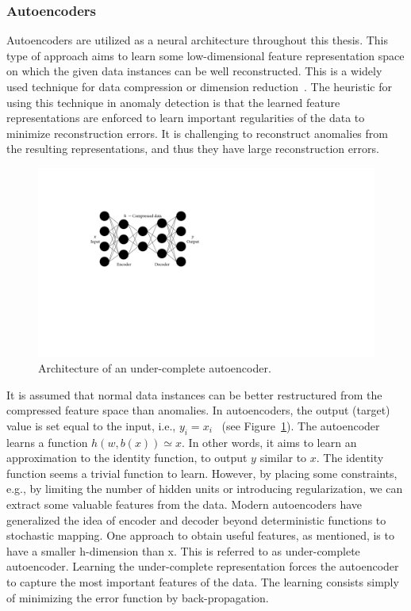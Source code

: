 \subsubsection{Autoencoders}\label{ch:background:sec:anomalydetection:subsec:deepanomaly:subsubsec:autoencoders}
Autoencoders are utilized as a neural architecture throughout this thesis. This type of approach aims to learn some low-dimensional feature representation space on which the given data instances can be well reconstructed. This is a widely used technique for data compression or dimension reduction~\cite{hinton2006reducing,wang2014generalized,sakurada2014anomaly}. The heuristic for using this technique in anomaly detection is that the learned feature representations are enforced to learn important regularities of the data to minimize reconstruction errors. It is challenging to reconstruct anomalies from the resulting representations, and thus they have large reconstruction errors.


\begin{figure}[!t]
\centerline{\includegraphics[scale=1.1]{gfx/chap2/autoencoder.pdf}}
\caption{Architecture of an under-complete autoencoder.}
\label{fig:autoencoder}
\end{figure}

It is assumed that normal data instances can be better restructured from the compressed feature space than anomalies. In autoencoders, the output (target) value is set equal to the input, i.e., $y_i=x_i$~\cite{hinton2006reducing} (see Figure~\ref{fig:autoencoder}). 
The autoencoder learns a function $h(w,b(x)) \simeq x$. 
In other words, it aims to learn an approximation to the identity function, to output $y$ similar to $x$.
The identity function seems a trivial function to learn. However, by placing some constraints, e.g., by limiting the number of hidden units or introducing regularization, we can extract some valuable features from the data.
Modern autoencoders have generalized the idea of encoder and decoder beyond deterministic functions to stochastic mapping.
One approach to obtain useful features, as mentioned, is to have a smaller h-dimension than x. 
This is referred to as under-complete autoencoder. Learning the under-complete representation forces the autoencoder to capture the most important features of the data. 
The learning consists simply of minimizing the error function by back-propagation.

